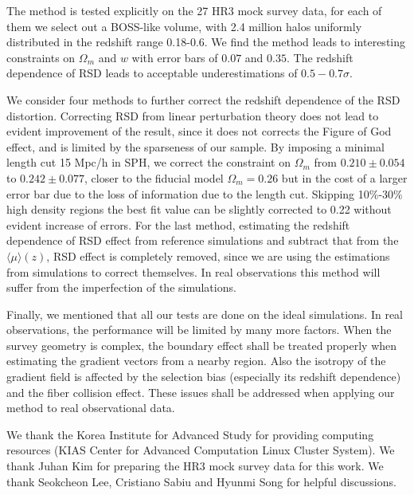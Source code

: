 \documentclass{emulateapj}
\begin{document}
The method is tested explicitly on the 27 HR3 mock survey data,
for each of them we select out a BOSS-like volume,
with 2.4 million halos uniformly distributed in the redshift range 0.18-0.6.
We find the method leads to interesting constraints on $\Omega_m$ and $w$ with error bars of $0.07$ and $0.35$.
The redshift dependence of RSD leads to acceptable underestimations of $0.5-0.7\sigma$.

We consider four methods to further correct the redshift dependence of the RSD distortion.
Correcting RSD from linear perturbation theory does not lead to evident improvement of the result,
since it does not corrects the Figure of God effect, and is limited by the sparseness of our sample.
By imposing a minimal length cut 15 Mpc/h in SPH, 
we correct the constraint on $\Omega_m$ from $0.210\pm0.054$ to $0.242\pm0.077$, 
closer to the fiducial model $\Omega_m=0.26$ but in the cost of a larger error bar due to the loss of information due to the length cut.
Skipping 10\%-30\% high density regions the best fit value can be slightly corrected to 0.22 without evident increase of errors.
For the last method, estimating the redshift dependence of RSD effect from reference simulations 
and subtract that from the $\langle\mu\rangle(z)$, RSD effect is completely removed,
since we are using the estimations from simulations to correct themselves.
In real observations this method will suffer from the imperfection of the simulations.

Finally, we mentioned that all our tests are done on the ideal simulations.
In real observations, the performance will be limited by many more factors.
When the survey geometry is complex, the boundary effect shall be treated properly when estimating the gradient vectors from a nearby region.
Also the isotropy of the gradient field is affected by the selection bias (especially its redshift dependence) 
and the fiber collision effect.
These issues shall be addressed when applying our method to real observational data.


\acknowledgments

We thank the Korea Institute for Advanced Study for providing computing resources (KIAS Center for Advanced Computation Linux Cluster System).
We thank Juhan Kim for preparing the HR3 mock survey data for this work.
We thank Seokcheon Lee, Cristiano Sabiu and Hyunmi Song for helpful discussions.


\end{document}
